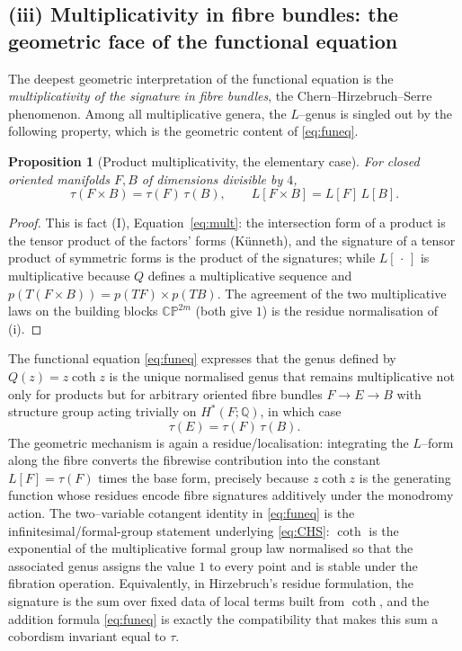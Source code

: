 \documentclass[12pt]{article}
\newtheorem{proposition}{Proposition}
\theoremstyle{definition}
\begin{document}
\subsection*{(iii) Multiplicativity in fibre bundles: the geometric face of the functional
equation}

The deepest geometric interpretation of the functional equation is the
\emph{multiplicativity of the signature in fibre bundles}, the Chern--Hirzebruch--Serre
phenomenon.  Among all multiplicative genera, the $L$--genus is singled out by the
following property, which is the geometric content of \eqref{eq:funeq}.

\begin{proposition}[Product multiplicativity, the elementary case]\label{prop:prodmult}
For closed oriented manifolds $F,B$ of dimensions divisible by $4$,
\[
\tau(F\times B)=\tau(F)\,\tau(B),\qquad L[F\times B]=L[F]\,L[B].
\]
\end{proposition}

\begin{proof}
This is fact (I), Equation~\eqref{eq:mult}: the intersection form of a product is the
tensor product of the factors' forms (K\"unneth), and the signature of a tensor product
of symmetric forms is the product of the signatures; while $L[\,\cdot\,]$ is multiplicative
because $Q$ defines a multiplicative sequence and $p(T(F\times B))=p(TF)\times p(TB)$.  The
agreement of the two multiplicative laws on the building blocks $\mathbb{CP}^{2m}$ (both
give $1$) is the residue normalisation of (i).
\end{proof}

\noindent
The functional equation \eqref{eq:funeq} expresses that the genus defined by $Q(z)=z\coth
z$ is the unique normalised genus that remains multiplicative not only for products but for
arbitrary oriented fibre bundles $F\to E\to B$ with structure group acting trivially on
$H^\ast(F;\mathbb Q)$, in which case
\[
\tau(E)=\tau(F)\,\tau(B).
\tag{13}\label{eq:CHS}
\]
The geometric mechanism is again a residue/localisation: integrating the $L$--form along
the fibre converts the fibrewise contribution into the constant $L[F]=\tau(F)$ times the
base form, precisely because $z\coth z$ is the generating function whose residues encode
fibre signatures additively under the monodromy action.  The two--variable cotangent
identity in \eqref{eq:funeq} is the infinitesimal/formal-group statement underlying
\eqref{eq:CHS}: $\coth$ is the exponential of the multiplicative formal group law
normalised so that the associated genus assigns the value $1$ to every point and is stable
under the fibration operation.  Equivalently, in Hirzebruch's residue formulation, the
signature is the sum over fixed data of local terms built from $\coth$, and the addition
formula \eqref{eq:funeq} is exactly the compatibility that makes this sum a cobordism
invariant equal to $\tau$.
\end{document}
